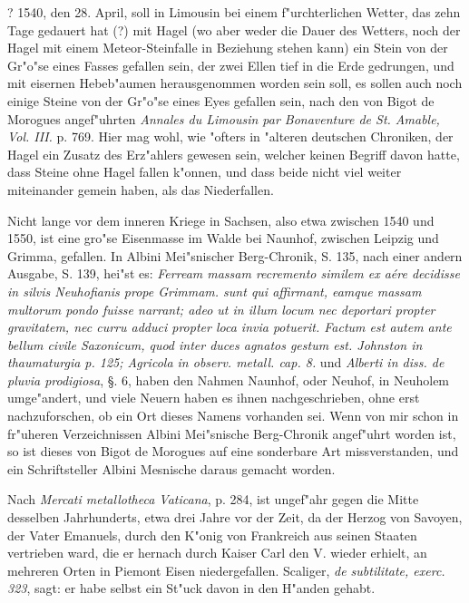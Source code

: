 \documentclass[a4paper, 11pt, oneside, polutonikogreek, german]{article}
\begin{document}
? 1540, den 28. April, soll in Limousin bei einem f"urchterlichen Wetter, das zehn Tage gedauert hat (?) mit Hagel (wo aber weder die Dauer des Wetters, noch der Hagel mit einem Meteor-Steinfalle in Beziehung stehen kann) ein Stein von der Gr"o"se eines Fasses gefallen sein, der zwei Ellen tief in die Erde gedrungen, und mit eisernen Hebeb"aumen herausgenommen worden sein soll, es sollen auch noch einige Steine von der Gr"o"se eines Eyes gefallen sein, nach den von Bigot de Morogues angef"uhrten \emph{Annales du Limousin par Bonaventure de St. Amable, Vol. III.} p. 769. Hier mag wohl, wie "ofters in "alteren deutschen Chroniken, der Hagel ein Zusatz des Erz"ahlers gewesen sein, welcher keinen Begriff davon hatte, dass Steine ohne Hagel fallen k"onnen, und dass beide nicht viel weiter miteinander gemein haben, als das Niederfallen.

Nicht lange vor dem inneren Kriege in Sachsen, also etwa zwischen 1540 und 1550, ist eine gro"se Eisenmasse im Walde bei Naunhof, zwischen Leipzig und Grimma, gefallen. In Albini Mei"snischer Berg-Chronik, S. 135, nach einer andern Ausgabe, S. 139, hei"st es: \emph{Ferream massam recremento similem ex aére decidisse in silvis Neuhofianis prope Grimmam. sunt qui affirmant, eamque massam multorum pondo fuisse narrant; adeo ut in illum locum nec deportari propter gravitatem, nec curru adduci propter loca invia potuerit. Factum est autem ante bellum civile Saxonicum, quod inter duces agnatos gestum est. Johnston in thaumaturgia p. 125; Agricola in observ. metall. cap. 8.} und \emph{Alberti in diss. de pluvia prodigiosa}, §. 6, haben den Nahmen Naunhof, oder Neuhof, in Neuholem umge"andert, und viele Neuern haben es ihnen nachgeschrieben, ohne erst nachzuforschen, ob ein Ort dieses Namens vorhanden sei. Wenn von mir schon in fr"uheren Verzeichnissen Albini Mei"snische Berg-Chronik angef"uhrt worden ist, so ist dieses von Bigot de Morogues auf eine sonderbare Art missverstanden, und ein Schriftsteller Albini Mesnische daraus gemacht worden.

Nach \emph{Mercati metallotheca Vaticana}, p. 284, ist ungef"ahr gegen die Mitte desselben Jahrhunderts, etwa drei Jahre vor der Zeit, da der Herzog von Savoyen, der Vater Emanuels, durch den K"onig von Frankreich aus seinen Staaten vertrieben ward, die er hernach durch Kaiser Carl den V. wieder erhielt, an mehreren Orten in Piemont Eisen niedergefallen. Scaliger, \emph{de subtilitate, exerc. 323}, sagt: er habe selbst ein St"uck davon in den H"anden gehabt.
\end{document}
